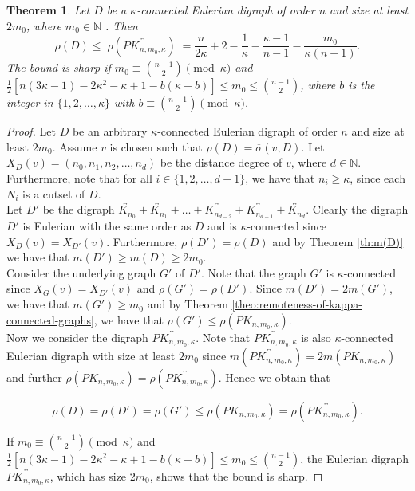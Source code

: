 \documentclass[a4paper,11pt]{article}
\newtheorem{theorem}{Theorem}[section]
\begin{document}
\begin{theorem}\label{th:rho(vertex connectivity - D)}
Let $ D $ be a $\kappa$-connected Eulerian digraph of order $ n $ and size at least $ 2m_{0} $, where $m_0 \in \mathbb{N}$ . Then 
\[\rho(D) \leq \; \rho(\overleftrightarrow{PK_{n,m_0, \kappa}}) \; =\frac{n}{2\kappa} +2 - \frac{1}{\kappa} - \frac{\kappa-1}{n-1} - \frac{m_0}{\kappa(n-1)}. \]
The bound is sharp if $m_0 \equiv \binom{n-1}{2} \pmod{\kappa}$ and
$\frac{1}{2} [ n(3\kappa-1) -2\kappa^2-\kappa+1 - b(\kappa-b) ] 
\leq m_0
\leq \binom{n-1}{2}$,
where $b$ is the integer in $\{1,2,\ldots,\kappa\}$ 
with $b \equiv \binom{n-1}{2} \pmod{\kappa}$.
\end{theorem}
\begin{proof}
Let $D$ be an arbitrary $\kappa$-connected Eulerian digraph of order $n$ and size at least $2m_{0}$. Assume $v$ is chosen such that $\rho(D)=\overline{\sigma}(v,D)$. Let $X_{D}(v)=(n_{0},n_{1},n_{2},\ldots,n_{d})$ be the distance degree of $v$, where $d \in \mathbb{N}$. Furthermore, note that for all $ i \in \{1,2, \ldots, d-1\} $, we have that $ n_i \geq \kappa $, since each $N_i$ is a cutset of $D$. \\ 

\noindent Let $D'$ be the digraph $\overleftrightarrow{K_{n_0}} + \overleftrightarrow{K_{n_1}} + \ldots + \overleftrightarrow{K_{n_{d-2}}} + \overleftrightarrow{K_{n_{d-1}}} + \overleftrightarrow{K_{n_d}}$. Clearly the digraph $D'$ is Eulerian with the same order as $D$ and is $\kappa$-connected since $X_{D}(v)=X_{D'}(v)$. Furthermore, $\rho(D')=\rho(D)$ and by Theorem \ref{th:m(D)} we have that $m(D') \geq m(D) \geq 2m_0$.\\

\noindent Consider the underlying graph $G'$ of $D'$.
Note that the graph $G'$ is $\kappa$-connected since  $X_{G}(v)=X_{D'}(v)$ and $\rho(G')=\rho(D')$. Since $m(D') = 2m(G')$, we have that $m(G') \geq m_0$ and by Theorem \ref{theo:remoteness-of-kappa-connected-graphs}, we have that $\rho(G') \leq \rho(PK_{n,m_0, \kappa})$. \\

\noindent Now we consider the digraph $\overleftrightarrow{PK_{n,m_0, \kappa}}$. Note that $\overleftrightarrow{PK_{n,m_0, \kappa}}$ is also $\kappa$-connected Eulerian digraph with size at least $2m_0$ since  $m(\overleftrightarrow{PK_{n,m_0, \kappa}})=2m(PK_{n,m_0, \kappa})$ and further $\rho(PK_{n,m_0, \kappa})=\rho(\overleftrightarrow{PK_{n,m_0, \kappa}})$. Hence we obtain that 

\[ \rho(D) = \rho(D') = \rho(G') 
       \leq \rho(PK_{n,m_0,\kappa})
    = \rho(\overleftrightarrow{PK_{n,m_0,\kappa}}).\]


If $m_0 \equiv \binom{n-1}{2} \pmod{\kappa}$ and
$\frac{1}{2} [ n(3\kappa-1) -2\kappa^2-\kappa+1 - b(\kappa-b) ] 
\leq m_0
\leq \binom{n-1}{2}$, the Eulerian digraph $\overleftrightarrow{PK_{n,m_0,\kappa}}$, which  has size $2m_0$, shows that the bound is sharp.
 \end{proof}
 
\end{document}
